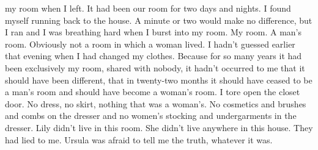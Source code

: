 \documentclass{novel}
\begin{document}
my room when I left. It had been our room for two days and nights. I found myself running back to the house. A minute or two would make no difference, but I ran and I was breathing hard when I burst into my room. My room. A man’s room. Obviously not a room in which a woman lived. I hadn’t guessed earlier that evening when I had changed my clothes. Because for so many years it had been exclusively my room, shared with nobody, it hadn’t occurred to me that it should have been different, that in twenty-two months it should have ceased to be a man’s room and should have become a woman’s room. I tore open the closet door. No dress, no skirt, nothing that was a woman’s. No cosmetics and brushes and combs on the dresser and no women’s stocking and undergarments in the dresser. Lily didn’t live in this room. She didn’t live anywhere in this house. They had lied to me. Ursula was afraid to tell me the truth, whatever it was.


\begin{ChapterStart}

\vspace{3\nbs}
\end{ChapterStart}

\end{document}
